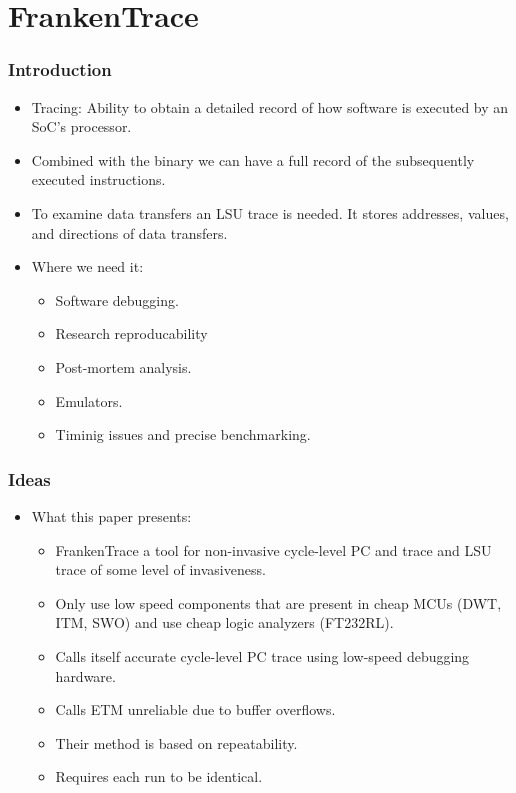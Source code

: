 \documentclass{beamer}
\begin{document}
\section{FrankenTrace}
\begin{frame}
    \frametitle{Introduction}
    \begin{itemize}
        \item Tracing: Ability to obtain a detailed record of how software is
            executed by an SoC's processor.
        \item Combined with the binary we can have a full record of the
            subsequently executed instructions.
        \item To examine data transfers an LSU trace is needed. It stores
            addresses, values, and directions of data transfers.
        \item Where we need it:
            \begin{itemize}
                \item Software debugging.
                \item Research reproducability
                \item Post-mortem analysis.
                \item Emulators.
                \item Timinig issues and precise benchmarking.
            \end{itemize}
    \end{itemize}
\end{frame}

\begin{frame}
    \frametitle{Ideas}
    \begin{itemize}
        \item What this paper presents:
            \begin{itemize}
                \item FrankenTrace a tool for non-invasive cycle-level PC and
                    trace and LSU trace of some level of invasiveness.
                \item Only use low speed components that are present in cheap
                    MCUs (DWT, ITM, SWO) and use cheap logic
                    analyzers (FT232RL).
                \item Calls itself accurate cycle-level PC trace using
                    low-speed debugging hardware.
                \item Calls ETM unreliable due to buffer overflows.
                \item Their method is based on repeatability.
                \item Requires each run to be identical.
            \end{itemize}
    \end{itemize}
\end{frame}
\end{document}
